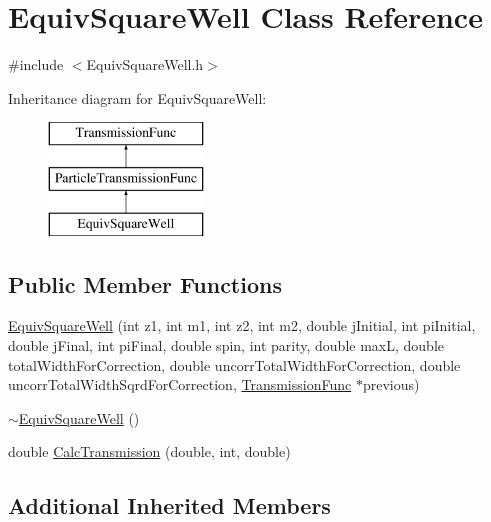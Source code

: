 \hypertarget{classEquivSquareWell}{\section{Equiv\-Square\-Well Class Reference}
\label{classEquivSquareWell}
}


{\ttfamily \#include $<$Equiv\-Square\-Well.\-h$>$}

Inheritance diagram for Equiv\-Square\-Well\-:\begin{figure}[H]
\begin{center}
\leavevmode
\includegraphics[height=3.000000cm]{d2/d7d/classEquivSquareWell}
\end{center}
\end{figure}
\subsection*{Public Member Functions}
\begin{DoxyCompactItemize}
\item 
\hyperlink{classEquivSquareWell_a234abbef3fc207ade23f1102689ddd01}{Equiv\-Square\-Well} (int z1, int m1, int z2, int m2, double j\-Initial, int pi\-Initial, double j\-Final, int pi\-Final, double spin, int parity, double max\-L, double total\-Width\-For\-Correction, double uncorr\-Total\-Width\-For\-Correction, double uncorr\-Total\-Width\-Sqrd\-For\-Correction, \hyperlink{classTransmissionFunc}{Transmission\-Func} $\ast$previous)
\item 
\hyperlink{classEquivSquareWell_a7a602878ee1afe77d692075ca394caec}{$\sim$\-Equiv\-Square\-Well} ()
\item 
double \hyperlink{classEquivSquareWell_a3b8b7b435b5fcdac36118458ffd5ade8}{Calc\-Transmission} (double, int, double)
\end{DoxyCompactItemize}
\subsection*{Additional Inherited Members}


